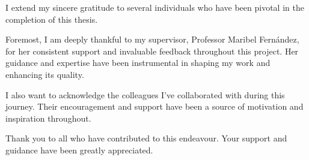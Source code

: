 I extend my sincere gratitude to several individuals who have been pivotal in the completion of this thesis.

Foremost, I am deeply thankful to my supervisor, Professor Maribel Fern{\'a}ndez, for her consistent support and invaluable feedback throughout this project. Her guidance and expertise have been instrumental in shaping my work and enhancing its quality.

I also want to acknowledge the colleagues I've collaborated with during this journey. Their encouragement and support have been a source of motivation and inspiration throughout.

Thank you to all who have contributed to this endeavour. Your support and guidance have been greatly appreciated.